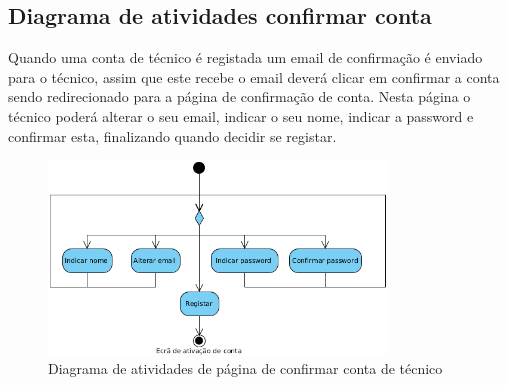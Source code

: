 \subsection{Diagrama de atividades confirmar conta}

Quando uma conta de técnico é registada um email de confirmação é enviado para o técnico, assim que este
recebe o email deverá clicar em confirmar a conta sendo redirecionado para a página de confirmação de conta.
Nesta página o técnico poderá alterar o seu email, indicar o seu nome, indicar a password e confirmar esta, 
finalizando quando decidir se registar.

\begin{figure}[htb]
    \centering
    \includegraphics[width=0.8\textwidth]{images/diagramas/atividades/diagrama_atividades_prof_register.png}
    \caption{Diagrama de atividades de página de confirmar conta de técnico}
    \label{fig:31}
\end{figure}